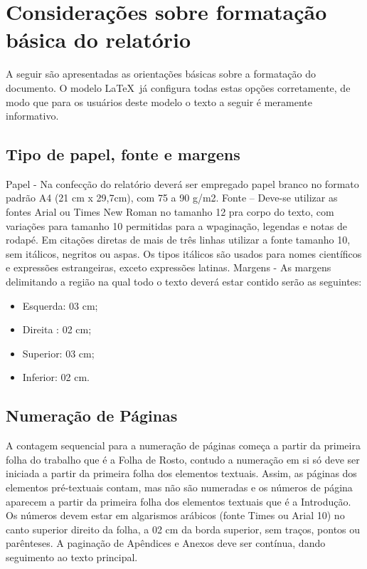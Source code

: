 \section{Considerações sobre formatação básica do relatório}
A seguir são apresentadas as orientações básicas sobre a formatação do
documento. O modelo \LaTeX\ já configura todas estas opções corretamente,
de modo que para os usuários deste modelo o texto a seguir é meramente
informativo.
\subsection{Tipo de papel, fonte e margens}
Papel - Na confecção do relatório deverá ser empregado papel branco no
formato padrão A4 (21 cm x 29,7cm), com 75 a 90 g/m2.
Fonte – Deve-se utilizar as fontes Arial ou Times New Roman no tamanho 12
pra corpo do texto, com variações para tamanho 10 permitidas para a
wpaginação, legendas e notas de rodapé. Em citações diretas de mais de três
linhas utilizar a fonte tamanho 10, sem itálicos, negritos ou aspas. Os
tipos itálicos são usados para nomes científicos e expressões estrangeiras,
exceto expressões latinas.
Margens - As margens delimitando a região na qual todo o texto deverá estar
contido serão as seguintes:
\begin{itemize}
\item Esquerda: 03 cm;
\item Direita : 02 cm;
\item Superior: 03 cm;
\item Inferior: 02 cm.
\end{itemize}
\subsection{Numeração de Páginas}
A contagem sequencial para a numeração de páginas começa a partir da
primeira folha do trabalho que é a Folha de Rosto, contudo a numeração em
si só deve ser iniciada a partir da primeira folha dos elementos textuais.
Assim, as páginas dos elementos pré-textuais contam, mas não são numeradas
e os números de página aparecem a partir da primeira folha dos elementos
textuais que é a Introdução.
Os números devem estar em algarismos arábicos (fonte Times ou Arial 10) no
canto superior direito da folha, a 02 cm da borda superior, sem traços,
pontos ou parênteses.
A paginação de Apêndices e Anexos deve ser contínua, dando seguimento ao
texto principal.

